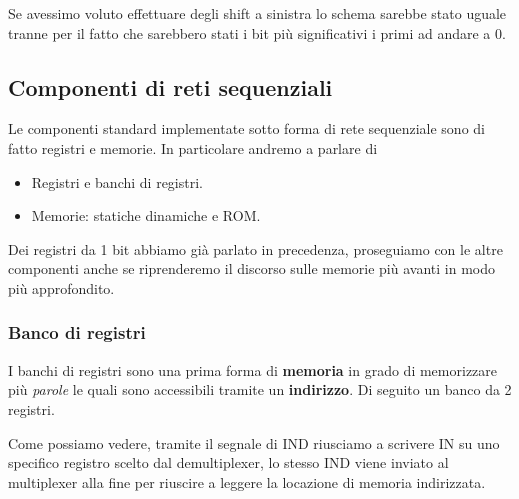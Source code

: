 Se avessimo voluto effettuare degli shift a sinistra lo schema sarebbe stato uguale tranne per il
fatto che sarebbero stati i bit più significativi i primi ad andare a 0.

\subsection{Componenti di reti sequenziali}
Le componenti standard implementate sotto forma di rete sequenziale sono di fatto registri e
memorie. In particolare andremo a parlare di
\begin{itemize}
	\item Registri e banchi di registri.
	\item Memorie: statiche dinamiche e ROM.
\end{itemize}
Dei registri da 1 bit abbiamo già parlato in precedenza, proseguiamo con le altre componenti anche
se riprenderemo il discorso sulle memorie più avanti in modo più approfondito.

\subsubsection{Banco di registri}
I banchi di registri sono una prima forma di \textbf{memoria} in grado di memorizzare più
\emph{parole} le quali sono accessibili tramite un \textbf{indirizzo}. Di seguito un banco da 2
registri.
\begin{center}
\end{center}
Come possiamo vedere, tramite il segnale di IND riusciamo a scrivere IN su uno specifico registro
scelto dal demultiplexer, lo stesso IND viene inviato al multiplexer alla fine per riuscire a
leggere la locazione di memoria indirizzata.


